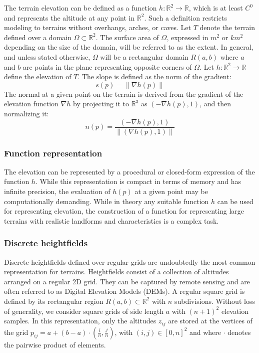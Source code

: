 \documentclass{article}
\begin{document}
The terrain elevation can be defined as a function $h : \mathbb{R}^2 \to \mathbb{R}$, which is at least $C^0$ and represents the altitude at any point in $\mathbb{R}^2$. Such a definition restricts modeling to terrains without overhangs, arches, or caves. Let $T$ denote the terrain defined over a domain $\Omega \subset \mathbb{R}^2$. The surface area of $\Omega$, expressed in $m^2$ or $km^2$ depending on the size of the domain, will be referred to as the extent. In general, and unless stated otherwise, $\Omega$ will be a rectangular domain $R(a,b)$ where $a$ and $b$ are points in the plane representing opposite corners of $\Omega$. Let $h : \mathbb{R}^2 \to \mathbb{R}$ define the elevation of $T$. The slope is defined as the norm of the gradient:
\[
s(p) = \|\nabla h(p)\|
\]
The normal at a given point on the terrain is derived from the gradient of the elevation function $\nabla h$ by projecting it to $\mathbb{R}^3$ as $(-\nabla h(p),1)$, and then normalizing it:
\[
n(p) = \frac{(-\nabla h(p),1)}{\|(\nabla h(p),1)\|}
\]

\subsubsection{Function representation}

The elevation can be represented by a procedural or closed-form expression of the function $h$. While this representation is compact in terms of memory and has infinite precision, the evaluation of $h(p)$ at a given point may be computationally demanding. While in theory any suitable function $h$ can be used for representing elevation, the construction of a function for representing large terrains with realistic landforms and characteristics is a complex task.

\subsubsection{Discrete heightfields}

Discrete heightfields defined over regular grids are undoubtedly the most common representation for terrains. Heightfields consist of a collection of altitudes arranged on a regular 2D grid. They can be captured by remote sensing and are often referred to as Digital Elevation Models (DEMs). A regular square grid is defined by its rectangular region $R(a,b) \subset \mathbb{R}^2$ with $n$ subdivisions. Without loss of generality, we consider square grids of side length $a$ with $(n+1)^2$ elevation samples. In this representation, only the altitudes $z_{ij}$ are stored at the vertices of the grid $p_{ij} = a + (b - a) \cdot \left(\frac{i}{n}, \frac{j}{n}\right)$, with $(i,j) \in [0,n]^2$ and where $\cdot$ denotes the pairwise product of elements.
\end{document}
